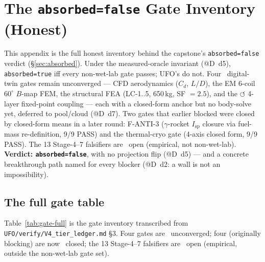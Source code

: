 \section{The \texttt{absorbed=false} Gate Inventory (Honest)}
\label{app:gateinv}

This appendix is the full honest inventory behind the capstone's
\texttt{absorbed=false} verdict (\S\ref{sec:absorbed}). Under the
measured-oracle invariant (@D~d5), \texttt{absorbed=true} iff every
non-wet-lab gate passes; UFO's do not. Four \tierOrange\ digital-twin
gates remain unconverged --- CFD aerodynamics ($C_d$, $L/D$), the EM
6-coil $60^{\circ}$ $B$-map FEM, the structural FEA (LC-1..5, 650\,kg,
SF $=2.5$), and the $\circlearrowleft$ 4-layer fixed-point coupling ---
each with a closed-form anchor but no body-solve yet, deferred to
pool/cloud (@D~d7). Two gates that earlier blocked were closed by
closed-form means in a later round: F-ANTI-3 ($\gamma$-rocket
$I_{\text{sp}}$ closure via fuel-mass re-definition, 9/9 PASS) and the
thermal-cryo gate (4-axis closed form, 9/9 PASS). The 13 Stage-4--7
falsifiers are \tierWhite\ open (empirical, not non-wet-lab).
\textbf{Verdict: \texttt{absorbed=false}}, with no projection flip
(@D~d5) --- and a concrete breakthrough path named for every blocker
(@D~d2: a wall is not an impossibility).

\subsection{The full gate table}
\label{app:gate-table}

Table~\ref{tab:gate-full} is the gate inventory transcribed from
\texttt{UFO/verify/V4\_tier\_ledger.md} \S3. Four gates are \tierOrange\
unconverged; four (originally blocking) are now \tierGreen\ closed; the
13 Stage-4--7 falsifiers are \tierWhite\ open (empirical, outside the
non-wet-lab gate set).

